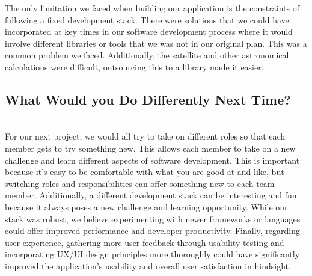 \documentclass{article}
\begin{document}
The only limitation we faced when building our application is the constraints of following a fixed development stack. There were solutions that we could have incorporated at key times in our software development process where it would involve different libraries or tools that we was not in our original plan. This was a common problem we faced. Additionally, the satellite and other astronomical calculations were difficult, outsourcing this to a library made it easier. 

\subsection{What Would you Do Differently Next Time?}

\\

For our next project, we would all try to take on different roles so that each member gets to try something new. This allows each member to take on a new challenge and learn different aspects of software development. This is important because it's easy to be comfortable with what you are good at and like, but switching roles and responsibilities can offer something new to each team member. Additionally, a different development stack can be interesting and fun because it always poses a new challenge and learning opportunity. While our stack was robust, we believe experimenting with newer frameworks or languages could offer improved performance and developer productivity. Finally, regarding user experience, gathering more user feedback through usability testing and incorporating UX/UI design principles more thoroughly could have significantly improved the application’s usability and overall user satisfaction in hindsight. 
\end{document}
